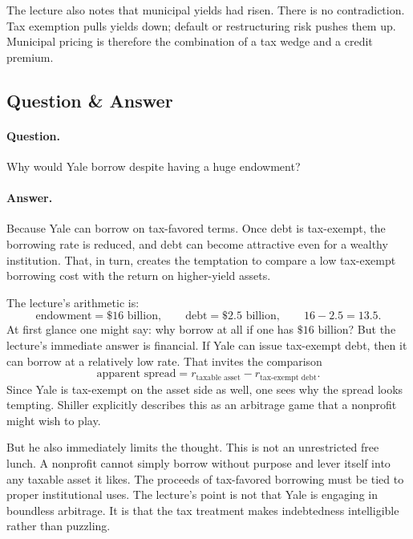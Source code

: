 The lecture also notes that municipal yields had risen. There is no contradiction. Tax exemption pulls yields down; default or restructuring risk pushes them up. Municipal pricing is therefore the combination of a tax wedge and a credit premium.

\subsection{Question \& Answer}

\paragraph{Question.} Why would Yale borrow despite having a huge endowment?

\paragraph{Answer.} Because Yale can borrow on tax-favored terms. Once debt is tax-exempt, the borrowing rate is reduced, and debt can become attractive even for a wealthy institution. That, in turn, creates the temptation to compare a low tax-exempt borrowing cost with the return on higher-yield assets.

The lecture's arithmetic is:
\begin{equation}
\text{endowment} = \$16\text{ billion},
\qquad
\text{debt} = \$2.5\text{ billion},
\qquad
16-2.5=13.5.
\end{equation}
At first glance one might say: why borrow at all if one has \(\$16\) billion? But the lecture's immediate answer is financial. If Yale can issue tax-exempt debt, then it can borrow at a relatively low rate. That invites the comparison
\begin{equation}
\text{apparent spread}=r_{\text{taxable asset}}-r_{\text{tax-exempt debt}}.
\end{equation}
Since Yale is tax-exempt on the asset side as well, one sees why the spread looks tempting. Shiller explicitly describes this as an arbitrage game that a nonprofit might wish to play.

But he also immediately limits the thought. This is not an unrestricted free lunch. A nonprofit cannot simply borrow without purpose and lever itself into any taxable asset it likes. The proceeds of tax-favored borrowing must be tied to proper institutional uses. The lecture's point is not that Yale is engaging in boundless arbitrage. It is that the tax treatment makes indebtedness intelligible rather than puzzling.

